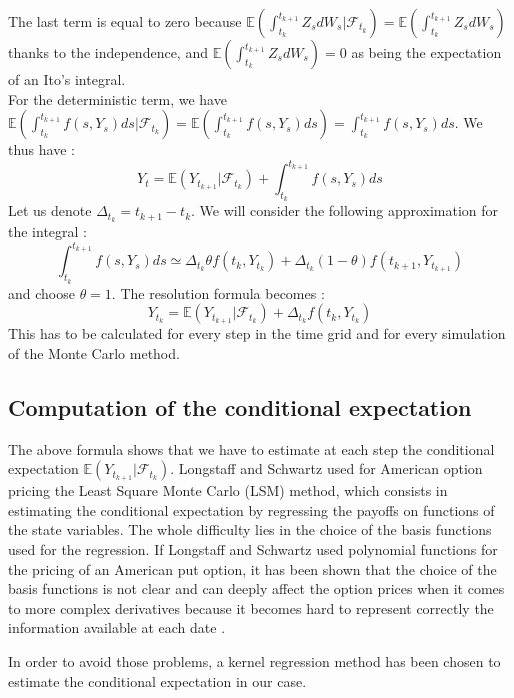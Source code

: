 \documentclass[a4paper,11pt,english]{book}
\begin{document}
The last term is equal to zero because $\mathbb{E}(\int_{t_{k}}^{t_{k+1}}Z_{s} dW_{s}|\mathcal{F}_{t_{k}})=\mathbb{E}(\int_{t_{k}}^{t_{k+1}}Z_{s} dW_{s})$ thanks to the independence, and $\mathbb{E}(\int_{t_{k}}^{t_{k+1}}Z_{s} dW_{s})=0$ as being the expectation of an Ito's integral.\\
For the deterministic term, we have $\mathbb{E}(\int_{t_{k}}^{t_{k+1}}f(s,Y_{s}) ds|\mathcal{F}_{t_{k}})=\mathbb{E}(\int_{t_{k}}^{t_{k+1}}f(s,Y_{s}) ds) = \int_{t_{k}}^{t_{k+1}}f(s,Y_{s}) ds$.
We thus have :
\begin{equation}
    Y_t = \mathbb{E}(Y_{t_{k+1}}|\mathcal{F}_{t_{k}}) + \int_{t_{k}}^{t_{k+1}}f(s,Y_{s}) ds
\end{equation}
Let us denote $\Delta_{t_k}=t_{k+1}-t_{k}$. We will consider the following approximation for the integral :
$$\int_{t_{k}}^{t_{k+1}}f(s,Y_{s})ds \simeq \Delta_{t_{k}}\theta f(t_{k},Y_{t_{k}}) + \Delta_{t_{k}}(1-\theta) f(t_{k+1},Y_{t_{k+1}})$$
and choose $\theta=1$. The resolution formula becomes :
\begin{equation}
Y_{t_{k}} = \mathbb{E}(Y_{t_{k+1}}|\mathcal{F}_{t_{k}}) + \Delta_{t_{k}}f(t_{k},Y_{t_{k}})
\label{resolutionFormula}
\end{equation}
This has to be calculated for every step in the time grid and for every simulation of the Monte Carlo method.
\subsection{Computation of the conditional expectation}
\label{subsec:conditional-expectation}
The above formula shows that we have to estimate at each step the conditional expectation $\mathbb{E}(Y_{t_{k+1}}|\mathcal{F}_{t_k})$. Longstaff and Schwartz \cite{schwartz2001valuing} used for American option pricing the Least Square Monte Carlo (LSM) method, which consists in estimating the conditional expectation by regressing the payoffs on functions of the state variables. The whole difficulty lies in the choice of the basis functions used for the regression. If Longstaff and Schwartz used polynomial functions for the pricing of an American put option, it has been shown that the choice of the basis functions is not clear and can deeply affect the option prices when it comes to more complex derivatives because it becomes hard to represent correctly the information available at each date \cite{moreno2003robustness}.

In order to avoid those problems, a kernel regression method has been chosen to estimate the conditional expectation in our case.\\
\end{document}

